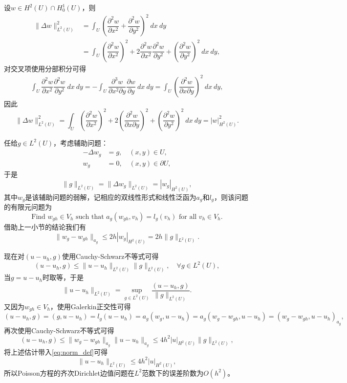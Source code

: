 \documentclass[a4paper,10pt]{ctexart}
\begin{document}
设$ w\in H^2(U)\cap H^1_0(U) $，则
\[
    \begin{aligned}
        \| \Delta w \|_{L^2(U)}^2
        &= \int_U \left( \dfrac{\partial^2 w}{\partial x^2} + \dfrac{\partial^2 w}{\partial y^2} \right)^2\ dx\ dy\\
        &= \int_U \left( \dfrac{\partial^2 w}{\partial x^2} \right)^2 + 2\dfrac{\partial^2 w}{\partial x^2}\dfrac{\partial^2 w}{\partial y^2} + \left( \dfrac{\partial^2 w}{\partial y^2} \right)^2\ dx\ dy,
    \end{aligned}
\]
对交叉项使用分部积分可得
\[
    \begin{aligned}
        \int_U \dfrac{\partial^2 w}{\partial x^2}\dfrac{\partial^2 w}{\partial y^2}\ dx\ dy = -\int_U \dfrac{\partial^3 w}{\partial x^2\partial y}\dfrac{\partial w}{\partial y}\ dx\ dy = \int_U \left( \dfrac{\partial^2 w}{\partial x\partial y}  \right)^2  \ dx\ dy,
    \end{aligned}
\]
因此
\begin{equation}
    \| \Delta w \|_{L^2(U)}^2 = \int_U \left( \dfrac{\partial^2 w}{\partial x^2} \right)^2 + 2\left( \dfrac{\partial^2 w}{\partial x\partial y}  \right)^2 + \left( \dfrac{\partial^2 w}{\partial y^2} \right)^2\ dx\ dy = | w |_{H^2(U)}^2.
\end{equation}

任给$ g\in L^2(U) $，考虑辅助问题：
\[
    \begin{aligned}
        -\Delta w_g &= g,\quad (x,y)\in U,\\
        w_g &= 0,\quad (x,y)\in \partial U,
    \end{aligned}  
\]
于是
\[
    \| g \|_{L^2(U)} = \| \Delta w_g \|_{L^2(U)} = | w_g |_{H^2(U)},
\]
其中$ w_g $是该辅助问题的弱解，记相应的双线性形式和线性泛函为$ a_g $和$ l_g $，则该问题的有限元问题为
\begin{equation}
    \text{Find } w_{gh}\in V_h \text{ such that } a_g(w_{gh},v_h) = l_g(v_h) \text{ for all } v_h\in V_h.
\end{equation}
借助上一小节的结论我们有
\begin{equation}
    \| w_g-w_{gh} \|_{a_g} \leqslant 2 h| w_g |_{H^2(U)} = 2h\| g \|_{L^2(U)}.
\end{equation}

现在对$ (u-u_h,g) $使用Cauchy-Schwarz不等式可得
\[
    (u-u_h,g) \leqslant \| u-u_h \|_{L^2(U)}\| g \|_{L^2(U)} ,\quad \forall g\in L^2(U),
\]
当$ g=u-u_h $时取等，于是
\begin{equation}\label{eq:norm_def}
    \| u-u_h \|_{L^2(U)} = \sup_{g\in L^2(U)} \dfrac{(u-u_h,g)}{\| g \|_{L^2(U)}}.
\end{equation}
又因为$ w_{gh}\in V_h $，使用Galerkin正交性可得
\[
    (u-u_h,g) = (g,u-u_h) = l_g(u-u_h) = a_g(w_g, u-u_h) = a_g(w_g-w_{gh}, u-u_h) = (w_g-w_{gh},u-u_h)_{a_g},
\]
再次使用Cauchy-Schwarz不等式可得
\[
    (u-u_h,g) \leqslant \| w_g-w_{gh} \|_{a_g}\| u-u_h \|_{a_g} \leqslant 4h^2 |u|_{H^2(U)}\| g \|_{L^2(U)},
\]
将上述估计带入\eqref{eq:norm_def}可得
\begin{equation}
    \| u-u_h \|_{L^2(U)} \leqslant 4h^2 |u|_{H^2(U)},
\end{equation}
所以Poisson方程的齐次Dirichlet边值问题在$ L^2 $范数下的误差阶数为$ O(h^2) $。
\end{document}
